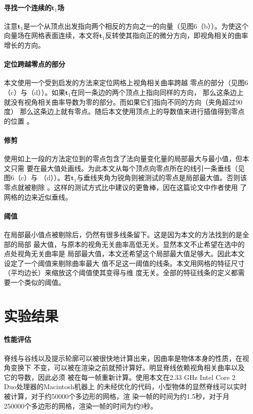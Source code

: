 \documentclass[10pt,a4paper]{article}
\theoremstyle{mythm}%
\numberwithin{equation}{section}
\begin{document}
\begin{CJK*}{UTF8}{wqyzh}
\paragraph*{寻找一个连续的$\bm{t}_1$场}
注意$\bm{t}_1$是一个从顶点出发指向两个相反的方向之一的向量（见图6（b））。为使这个
向量场在网格表面连续，本文将$\bm{t}_1$反转使其指向正的微分方向，即视角相关的曲率
增长的方向。

\paragraph*{定位跨越零点的部分}
本文使用一个受到\cite{Ohtake:2004:RVL}启发的方法来定位网格上视角相关曲率跨越
零点的部分（见图6（c）与（d））。如果$\bm{t}_1$在同一条边的两个顶点上指向同样的方向，
那么这条边上就没有视角相关曲率导数为零的部分。而如果它们指向不同的方向（夹角超过90度）
那么这条边上就有零点。随后本文使用顶点上的导数值来进行插值得到零点的位置
\cite{Hertzmann:2000:ISS}。

\paragraph*{修剪}
使用如上一段的方法定位到的零点包含了法向量变化量的局部最大与最小值，但本文只需
要在最大值处画线。为此本文从每个顶点向零点所在的线引一条垂线（见图6（c）与
（d））。若$\bm{t}_1$与垂线夹角为锐角则被测试的零点是局部最大值。否则该零点就被剔除
。这样的测试方式比\cite{Ohtake:2004:RVL}中建议的更鲁棒，因在这篇论文中作者使用
了网格的边来近似垂线。

\paragraph*{阈值}
在局部最小值点被剔除后，仍然有很多线条留下。这是因为本文的方法找到的是全部的局部
最大值，与原本的视角无关曲率高低无关。显然本文不止希望在选中的点处视角无关曲率是
局部最大值，本文还希望这个局部最大值足够大。因此本文设定了一个阈值来剔除曲率最大
值不足这一阈值的线条。本文用网格的特征尺寸（平均边长）来缩放这个阈值使其变得与维
度无关。全部的特征线条的定义都需要一个类似的阈值。



\section{实验结果}

\paragraph*{性能评估}
脊线与谷线以及提示轮廓可以被很快地计算出来，因曲率是物体本身的性质，在视角变换下
不变，可以被在渲染之前就预计算好。明显脊线依赖视角相关曲率以及它的导数，因此必须
被在每一帧重新计算。使用本文在2.33 GHz Intel Core 2 Duo处理器的Macintosh机器上
的未经优化的代码，小型物体的显然脊线可以实时被计算，对于约50000个多边形的网格，渲
染一帧的时间为约1.5秒，对于月250000个多边形的网格，渲染一帧的时间为约9秒。


\end{CJK*}
\end{document}
